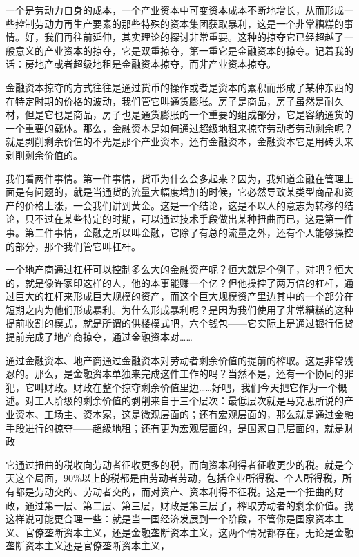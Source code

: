 \documentclass[UTF8, 12pt, a4paper]{ctexrep}
\begin{document}
一个是劳动力自身的成本，一个产业资本中可变资本成本不断地增长，从而形成一些控制劳动力再生产要素的那些特殊的资本集团获取暴利，这是一个非常糟糕的事情。好，我们再往前延伸，其实理论的探讨非常重要。这种的掠夺它已经超越了一般意义的产业资本的掠夺，它是双重掠夺，第一重它是金融资本的掠夺。记着我的话：房地产或者超级地租是金融资本掠夺，而非产业资本掠夺。

金融资本掠夺的方式往往是通过货币的操作或者是资本的累积而形成了某种东西的在特定时期的价格的波动，我们管它叫通货膨胀。房子是商品，房子虽然是耐久材，但是它也是商品，房子也是通货膨胀的一个重要的组成部分，它是容纳通货的一个重要的载体。那么，金融资本是如何通过超级地租来掠夺劳动者劳动剩余呢？就是剥削剩余价值的不光是那个产业资本，还有金融资本，金融资本它是用砖头来剥削剩余价值的。

我们看两件事情。第一件事情，货币为什么会多起来？因为，我知道金融在管理上面是有问题的，就是当通货的流量大幅度增加的时候，它必然导致某类型商品和资产的价格上涨，一会我们讲到黄金。这是一个结论，这是不以人的意志为转移的结论，只不过在某些特定的时期，可以通过技术手段做出某种扭曲而已，这是第一件事。第二件事情，金融之所以叫金融，它除了有总的流量之外，还有个人能够操控的部分，那个我们管它叫杠杆。

一个地产商通过杠杆可以控制多么大的金融资产呢？恒大就是个例子，对吧？恒大的，就是像许家印这样的人，他的本事能赚一个亿？但他操控了两万倍的杠杆，通过巨大的杠杆来形成巨大规模的资产，而这个巨大规模资产里边其中的一个部分在短期之内为他们形成暴利。为什么形成暴利呢？是因为我们使用了非常糟糕的这种提前收割的模式，就是所谓的供楼模式吧，六个钱包——它实际上是通过银行信贷提前完成了地产商掠夺，通过金融资本对……

通过金融资本、地产商通过金融资本对劳动者剩余价值的提前的榨取。这是非常残忍的。那么，是金融资本单独来完成这件工作的吗？当然不是，还有一个协同的罪犯，它叫财政。财政在整个掠夺剩余价值里边……好吧，我们今天把它作为一个概述。对工人阶级的剩余价值的剥削来自于三个层次：最低层次就是马克思所说的产业资本、工场主、资本家，这是微观层面的；还有宏观层面的，那么就是通过金融手段进行的掠夺——超级地租；还有更为宏观层面的，是国家自己层面的，就是财政

它通过扭曲的税收向劳动者征收更多的税，而向资本利得者征收更少的税。就是今天这个局面，90\%以上的税都是由劳动者劳动，包括企业所得税、个人所得税，所有都是劳动交的、劳动者交的，而对资产、资本利得不征税。这是一个扭曲的财政，通过第一层、第二层、第三层，财政是第三层了，榨取劳动者的剩余价值。我这样说可能更合理一些：就是当一国经济发展到一个阶段，不管你是国家资本主义、官僚垄断资本主义，还是金融垄断资本主义，这两个情况都存在，无论是金融垄断资本主义还是官僚垄断资本主义，
\end{document}
